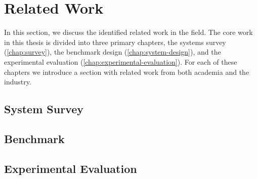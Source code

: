 \section{Related Work}
\label{sec:background:related-work}

In this section, we discuss the identified related work in the field. The core work in this thesis is divided into three primary chapters, the systems survey (\cref{chap:survey}), the benchmark design (\cref{chap:system-design}), and the experimental evaluation (\cref{chap:experimental-evaluation}). For each of these chapters we introduce a section with related work from both academia and the industry.

\subsection{System Survey}
\label{sec:background:related-work:survey}


\subsection{Benchmark}
\label{sec:background:related-work:survey}


\subsection{Experimental Evaluation}
\label{sec:background:related-work:survey}
